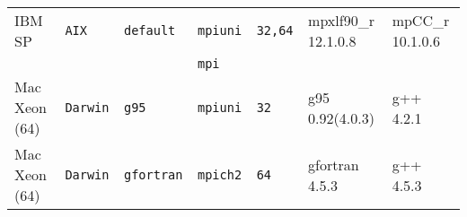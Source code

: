 \begin{longtable}{lllllll}
IBM SP                &\tt AIX    &\tt default      &\tt mpiuni      &\tt 32,64           & mpxlf90\_r \footnotesize 12.1.0.8  & mpCC\_r \footnotesize 10.1.0.6  \\ %
                      &           &                 &\tt mpi         &                    &                                    &                                 \\
Mac Xeon (64)         &\tt Darwin &\tt g95          &\tt mpiuni     &\tt 32              & g95 \footnotesize 0.92(4.0.3)       & g++ \footnotesize 4.2.1         \\ %
Mac Xeon (64)         &\tt Darwin &\tt gfortran     &\tt mpich2     &\tt 64              & gfortran \footnotesize 4.5.3       & g++ \footnotesize 4.5.3         \\ %

\end{longtable}
